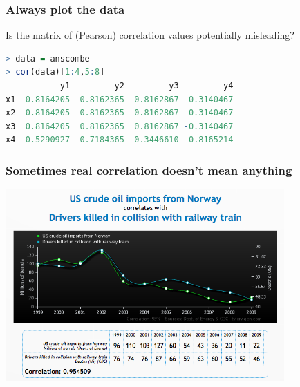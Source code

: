\begin{frame}[fragile]
  \frametitle{Always plot the data}
    Is the matrix of (Pearson) correlation values potentially misleading?
\begin{lstlisting}[language=R]
> data = anscombe
> cor(data)[1:4,5:8]
           y1         y2         y3         y4
x1  0.8164205  0.8162365  0.8162867 -0.3140467
x2  0.8164205  0.8162365  0.8162867 -0.3140467
x3  0.8164205  0.8162365  0.8162867 -0.3140467
x4 -0.5290927 -0.7184365 -0.3446610  0.8165214
\end{lstlisting}
\end{frame}

\begin{frame}
  \frametitle{Sometimes real correlation doesn't mean anything}
  \begin{center}
    \includegraphics[width=0.8\textwidth]{images/spurious_correlation} \\
  \end{center}
\end{frame}